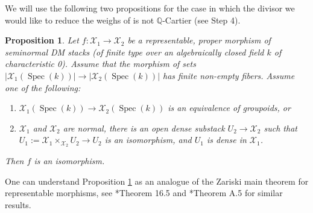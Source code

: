 \documentclass[11pt]{amsart}
\newcommand{\sX}{\mathscr{X}}
\newcommand{\spec}{\operatorname{Spec}}
\newtheorem{Prop}[theorem]{Proposition}
\theoremstyle{definition}
\begin{document}
We will use the following two propositions for the case in which the divisor we would like to reduce the weighs of is not $\mathbb{Q}$-Cartier (see Step 4).

\begin{Prop}\label{proposition:iso:dm:stacks}
 Let $f:\sX_1 \to \sX_2$ be a representable, proper morphism of seminormal DM stacks (of finite type over an algebraically closed field $k$
 of characteristic 0).
 Assume that the morphism of sets $|\sX_1(\spec(k))| \to |\sX_2(\spec(k))|$ has finite non-empty fibers. Assume one of the following:
 \begin{enumerate}
  \item $\sX_1(\spec(k)) \to \sX_2(\spec(k))$ is an equivalence of groupoids, or
  \item $\sX_1$ and $\sX_2$ are normal, there
  is an open dense substack $U_2 \to \sX_2$ such that $U_1:=\sX_1 \times_{\sX_2} U_2 \to U_2$
  is an isomorphism, and $U_1$ is dense in $\sX_1$.
 \end{enumerate}

 
 Then $f$ is an isomorphism. 
\end{Prop}
One can understand Proposition \ref{proposition:iso:dm:stacks} as an analogue of the Zariski main theorem for representable morphisms, see \cite{LMB}*{Theorem 16.5} and \cite{Picard}*{Theorem A.5} for similar results. 
\end{document}
